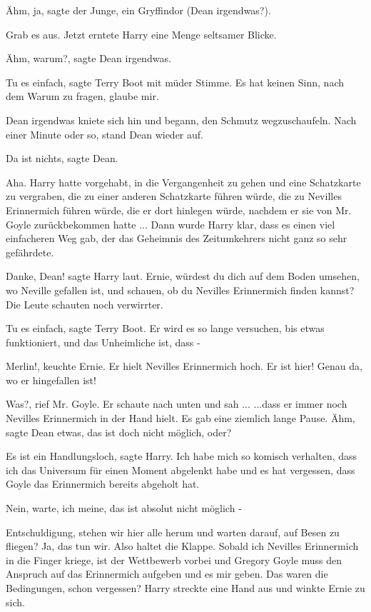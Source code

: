 \glqq{}Ähm, ja\grqq{}, sagte der Junge, ein Gryffindor (Dean irgendwas?).

\glqq{}Grab es aus.\grqq{} Jetzt erntete Harry eine Menge seltsamer Blicke.

\glqq{}Ähm, warum?\grqq{}, sagte Dean irgendwas.

\glqq{}Tu es einfach\grqq{}, sagte Terry Boot mit müder Stimme. \glqq{}Es hat
keinen Sinn, nach dem Warum zu fragen, glaube mir.\grqq{}

Dean irgendwas kniete sich hin und begann, den Schmutz wegzuschaufeln. Nach
einer Minute oder so, stand Dean wieder auf.

\glqq{}Da ist nichts\grqq{}, sagte Dean.

Aha. Harry hatte vorgehabt, in die Vergangenheit zu gehen und eine Schatzkarte
zu vergraben, die zu einer anderen Schatzkarte führen würde, die zu Nevilles
Erinnermich führen würde, die er dort hinlegen würde, nachdem er sie von Mr.
Goyle zurückbekommen hatte ... Dann wurde Harry klar, dass es einen viel
einfacheren Weg gab, der das Geheimnis des Zeitumkehrers nicht ganz so sehr
gefährdete.

\glqq{}Danke, Dean!\grqq{} sagte Harry laut. \glqq{}Ernie, würdest du dich auf dem
Boden umsehen, wo Neville gefallen ist, und schauen, ob du Nevilles Erinnermich
finden kannst?\grqq{} Die Leute schauten noch verwirrter.

\glqq{}Tu es einfach\grqq{}, sagte Terry Boot. \glqq{}Er wird es so lange
versuchen, bis etwas funktioniert, und das Unheimliche ist, dass -\grqq{}

\glqq{}Merlin!\grqq{}, keuchte Ernie. Er hielt Nevilles Erinnermich hoch. \glqq{}
Er ist hier! Genau da, wo er hingefallen ist!\grqq{}

\glqq{}Was?\grqq{}, rief Mr. Goyle. Er schaute nach unten und sah ... ...dass er
immer noch Nevilles Erinnermich in der Hand hielt. Es gab eine ziemlich lange
Pause. \glqq{}Ähm\grqq{}, sagte Dean etwas, \glqq{}das ist doch nicht möglich,
oder?\grqq{}

\glqq{}Es ist ein Handlungsloch\grqq{}, sagte Harry. \glqq{}Ich habe mich so
komisch verhalten, dass ich das Universum für einen Moment abgelenkt habe und es
hat vergessen, dass Goyle das Erinnermich bereits abgeholt hat.\grqq{}

\glqq{}Nein, warte, ich meine, das ist absolut nicht möglich -\grqq{}

\glqq{}Entschuldigung, stehen wir hier alle herum und warten darauf, auf Besen zu
fliegen? Ja, das tun wir. Also haltet die Klappe. Sobald ich Nevilles
Erinnermich in die Finger kriege, ist der Wettbewerb vorbei und Gregory Goyle
muss den Anspruch auf das Erinnermich aufgeben und es mir geben. Das waren die
Bedingungen, schon vergessen?\grqq{} Harry streckte eine Hand aus und winkte
Ernie zu sich.


